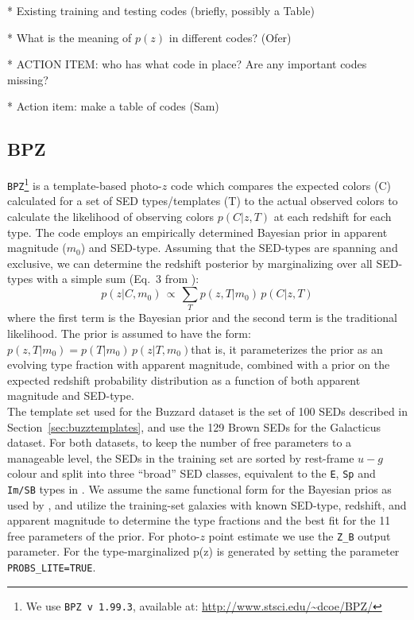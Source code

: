 \documentclass[usenatbib]{mn2e}
\begin{document}
* Existing training and testing codes (briefly, possibly a Table)

* What is the meaning of $p(z)$ in different codes? (Ofer) 

* ACTION ITEM: who has what code in place? Are any important codes missing?

* Action item: make a table of codes (Sam)

\subsection{BPZ}\label{sec:BPZ}
\texttt{BPZ}\footnote{We use \texttt{BPZ v 1.99.3}, available at: \url{http://www.stsci.edu/~dcoe/BPZ/}} \citep[Bayesian Photometric-$z$, see][for details]{Benitez:00} is a template-based photo-$z$ code which compares the expected colors (C) calculated for a set of SED types/templates (T) to the actual observed colors to calculate the likelihood of observing colors $p(C|z,T)$ at each redshift for each type.  The code employs an empirically determined Bayesian prior in apparent magnitude ($m_0$) and SED-type.  Assuming that the SED-types are spanning and exclusive, we can determine the redshift posterior by marginalizing over all SED-types with a simple sum (Eq.~3 from \citet[]{Benitez:00}):
\begin{equation}
p(z|C,m_0)\,\propto\, \sum_{T}p(z,T|m_0)\,p(C|z,T)
\end{equation}
\noindent where the first term is the Bayesian prior and the second term is the traditional likelihood.  The prior is assumed to have the form: $p(z,T|m_0) = p(T|m_0)\,p(z|T,m_0)$that is, it parameterizes the prior as an evolving type fraction with apparent magnitude, combined with a prior on the expected redshift probability distribution as a function of both apparent magnitude and SED-type.\\

The template set used for the Buzzard dataset is the set of 100 SEDs described in Section~\ref{sec:buzztemplates}, and use the 129 Brown SEDs for the Galacticus dataset.  For both datasets, to keep the number of free parameters to a manageable level, the SEDs in the training set are sorted by rest-frame $u-g$ colour and split into three ``broad'' SED classes, equivalent to the \texttt{E}, \texttt{Sp} and \texttt{Im/SB} types in \citet[]{Benitez:00}.  We assume the same functional form for the Bayesian prios as used by \citet[]{Benitez:00}, and utilize the training-set galaxies with known SED-type, redshift, and apparent magnitude to determine the type fractions and the best fit for the 11 free parameters of the prior.  For photo-$z$ point estimate we use the \texttt{Z\_B} output parameter.  For the type-marginalized p(z) is generated by setting the parameter \texttt{PROBS\_LITE=TRUE}.
\end{document}
